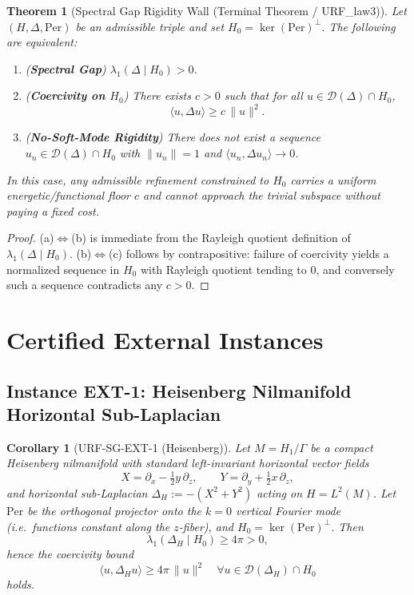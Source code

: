 \documentclass[11pt]{article}
\newtheorem{theorem}{Theorem}
\newtheorem{corollary}{Corollary}
\begin{document}
\begin{theorem}[Spectral Gap Rigidity Wall (Terminal Theorem / URF\_law3)]
\label{thm:URF-law3-terminal}
Let $(H,\Delta,\mathrm{Per})$ be an admissible triple and set $H_0=\ker(\mathrm{Per})^\perp$.
The following are equivalent:
\begin{enumerate}[label=(\alph*)]
\item (\textbf{Spectral Gap}) $\lambda_1(\Delta\mid H_0)>0$.
\item (\textbf{Coercivity on $H_0$}) There exists $c>0$ such that for all
      $u\in \mathcal D(\Delta)\cap H_0$,
      \[
      \langle u,\Delta u\rangle \ge c\,\|u\|^2.
      \]
\item (\textbf{No-Soft-Mode Rigidity}) There does not exist a sequence
      $u_n\in \mathcal D(\Delta)\cap H_0$ with $\|u_n\|=1$ and $\langle u_n,\Delta u_n\rangle\to 0$.
\end{enumerate}
In this case, any admissible refinement constrained to $H_0$ carries a uniform energetic/functional
floor $c$ and cannot approach the trivial subspace without paying a fixed cost.
\end{theorem}

\begin{proof}
(a)$\Leftrightarrow$(b) is immediate from the Rayleigh quotient definition of $\lambda_1(\Delta\mid H_0)$.
(b)$\Leftrightarrow$(c) follows by contrapositive: failure of coercivity yields a normalized sequence in $H_0$
with Rayleigh quotient tending to $0$, and conversely such a sequence contradicts any $c>0$.
\end{proof}

\section{Certified External Instances}

\subsection*{Instance EXT-1: Heisenberg Nilmanifold Horizontal Sub-Laplacian}

\begin{corollary}[URF-SG-EXT-1 (Heisenberg)]
Let $M=H_1/\Gamma$ be a compact Heisenberg nilmanifold with standard left-invariant
horizontal vector fields
\[
X=\partial_x-\tfrac12 y\,\partial_z,\qquad
Y=\partial_y+\tfrac12 x\,\partial_z,
\]
and horizontal sub-Laplacian $\Delta_H:=-(X^2+Y^2)$ acting on $H=L^2(M)$.
Let $\mathrm{Per}$ be the orthogonal projector onto the $k=0$ vertical Fourier mode
(i.e.\ functions constant along the $z$-fiber), and $H_0=\ker(\mathrm{Per})^\perp$.
Then
\[
\lambda_1(\Delta_H\mid H_0)\ge 4\pi>0,
\]
hence the coercivity bound
\[
\langle u,\Delta_H u\rangle \ge 4\pi\,\|u\|^2
\quad \forall u\in \mathcal D(\Delta_H)\cap H_0
\]
holds.
\end{corollary}
\end{document}

